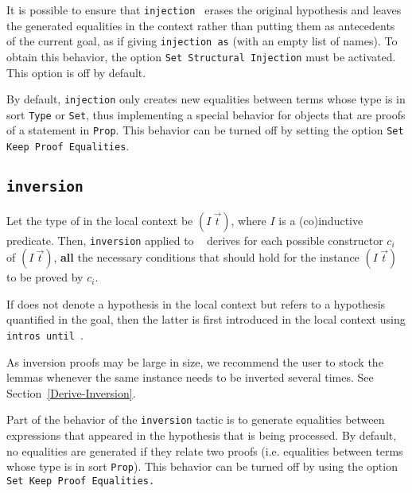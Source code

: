 \begin{coq_example*}
\begin{Variants}
\end{Variants}


It is possible to ensure that \texttt{injection {\term}} erases the
original hypothesis and leaves the generated equalities in the context
rather than putting them as antecedents of the current goal, as if
giving \texttt{injection {\term} as} (with an empty list of names). To
obtain this behavior, the option {\tt Set Structural Injection} must
be activated. This option is off by default.

By default, \texttt{injection} only creates new equalities between
terms whose type is in sort \texttt{Type} or \texttt{Set}, thus
implementing a special behavior for objects that are proofs
of a statement in \texttt{Prop}.  This behavior can be turned off
by setting the option \texttt{Set Keep Proof Equalities}.
\subsection{\tt inversion \ident}

Let the type of {\ident} in the local context be $(I~\vec{t})$,
where $I$ is a (co)inductive predicate. Then,
\texttt{inversion} applied to \ident~ derives for each possible
constructor $c_i$ of $(I~\vec{t})$, {\bf all} the necessary
conditions that should hold for the instance $(I~\vec{t})$ to be
proved by $c_i$.

\Rem If {\ident} does not denote a hypothesis in the local context
but refers to a hypothesis quantified in the goal, then the
latter is first introduced in the local context using
\texttt{intros until \ident}.

\Rem As inversion proofs may be large in size, we recommend the user to
stock the lemmas whenever the same instance needs to be inverted
several times. See Section~\ref{Derive-Inversion}.

\Rem Part of the behavior of the \texttt{inversion} tactic is to generate
equalities between expressions that appeared in the hypothesis that is
being processed.  By default, no equalities are generated if they relate
two proofs (i.e. equalities between terms whose type is in
sort \texttt{Prop}).  This behavior can be turned off by using the option
\texttt{Set Keep Proof Equalities.}

\end{coq_example*}
